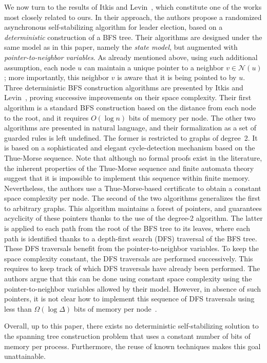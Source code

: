 \documentclass[a4paper, 12pt]{article}
\begin{document}
We now turn to the results of Itkis and Levin~\cite{IL94}, which constitute one of the works most closely related to ours.  In their approach, the authors propose a randomized asynchronous self-stabilizing algorithm for leader election, based on a \emph{deterministic} construction of a BFS tree. Their algorithms are designed  under the same model as in this paper, namely the \emph{state model}, but augmented with \emph{pointer-to-neighbor variables}. As already mentioned above, using such additional assumption, each node $u$ can maintain a unique pointer to a neighbor $v\in \mathcal{N}(u)$; more importantly, this neighbor $v$ is aware that it is being pointed to by $u$.
Three deterministic BFS construction algorithms are presented by Itkis and Levin~\cite{IL94}, proving successive improvements on their space complexity. Their first algorithm is a standard BFS construction based on the distance from each node to the root, and it requires $O(\log n)$ bits of memory per node. The other two algorithms are presented in natural language, and their formalization as a set of guarded rules is left undefined. The former is restricted to graphs of degree~2. It is based on a sophisticated and elegant cycle-detection mechanism based on the Thue-Morse sequence. 
Note that although no formal proofs exist in the literature, the inherent properties of the Thue-Morse sequence and finite automata theory suggest that it is impossible to implement this sequence within finite memory. Nevertheless, the authors use a Thue-Morse-based certificate to obtain a constant space complexity per node. The second of the two algorithms generalizes the first to arbitrary graphs. This algorithm maintains a forest of pointers, and guarantees acyclicity of these pointers thanks to the use of the degree-2 algorithm. The latter is applied to each path from the root of the BFS tree to its leaves, where each path is identified thanks to a depth-first search (DFS) traversal of the BFS tree.  These DFS traversals benefit from the pointer-to-neighbor variables. To keep the space complexity constant, the DFS traversals are performed successively. This requires to keep track of which DFS traversals have already been performed. The authors argue that this can be done using constant space complexity using the pointer-to-neighbor variables allowed by their model. However, in absence of such pointers, it is not clear how to implement this sequence of DFS traversals using less than $\Omega(\log \Delta)$ bits of memory per node~\cite{CD94,DattaJPV00}.

Overall, up to this paper, there exists no deterministic self-stabilizing solution to the spanning tree construction problem that uses a constant number of bits of memory per process. Furthermore, the reuse of known techniques makes this goal unattainable.
\end{document}
